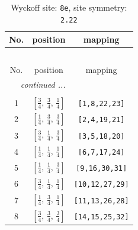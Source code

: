 \documentclass[fleqn,8pt]{jsarticle}
\begin{document}
\renewcommand{\arraystretch}{1.2}
\begin{longtable}{ccc}
\caption{Wyckoff site: {\tt 8e}, site symmetry: {\tt 2.22}}
 \\
 \hline \hline
No. & position & mapping \\ \hline \endfirsthead

\multicolumn{2}{l}{\tablename\ \thetable{}} \\
 \hline \hline
No. & position & mapping \\ \hline \endhead

 \hline \hline
\multicolumn{2}{r}{\footnotesize\it continued ...} \\ \endfoot

 \hline \hline
\multicolumn{2}{r}{} \\ \endlastfoot

1 & $\left[ \frac{3}{4},\, \frac{3}{4},\, \frac{1}{4} \right]$ & {\tt [1,8,22,23]} \\ \hline
2 & $\left[ \frac{1}{4},\, \frac{3}{4},\, \frac{3}{4} \right]$ & {\tt [2,4,19,21]} \\ \hline
3 & $\left[ \frac{3}{4},\, \frac{1}{4},\, \frac{3}{4} \right]$ & {\tt [3,5,18,20]} \\ \hline
4 & $\left[ \frac{1}{4},\, \frac{1}{4},\, \frac{1}{4} \right]$ & {\tt [6,7,17,24]} \\ \hline
5 & $\left[ \frac{1}{4},\, \frac{1}{4},\, \frac{3}{4} \right]$ & {\tt [9,16,30,31]} \\ \hline
6 & $\left[ \frac{3}{4},\, \frac{1}{4},\, \frac{1}{4} \right]$ & {\tt [10,12,27,29]} \\ \hline
7 & $\left[ \frac{1}{4},\, \frac{3}{4},\, \frac{1}{4} \right]$ & {\tt [11,13,26,28]} \\ \hline
8 & $\left[ \frac{3}{4},\, \frac{3}{4},\, \frac{3}{4} \right]$ & {\tt [14,15,25,32]} \\
\end{longtable}
\renewcommand{\arraystretch}{1.2}
\end{document}
